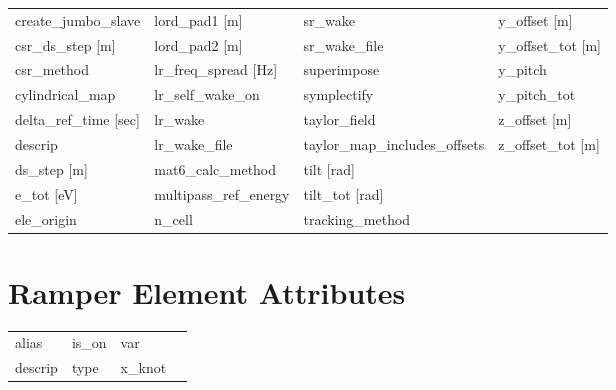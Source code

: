 \begin{tabular}{llll}
create_jumbo_slave               & lord_pad1 [m]                    & sr_wake                          & y_offset [m]                     \\
csr_ds_step [m]                  & lord_pad2 [m]                    & sr_wake_file                     & y_offset_tot [m]                 \\
csr_method                       & lr_freq_spread [Hz]              & superimpose                      & y_pitch                          \\
cylindrical_map                  & lr_self_wake_on                  & symplectify                      & y_pitch_tot                      \\
delta_ref_time [sec]             & lr_wake                          & taylor_field                     & z_offset [m]                     \\
descrip                          & lr_wake_file                     & taylor_map_includes_offsets      & z_offset_tot [m]                 \\
ds_step [m]                      & mat6_calc_method                 & tilt [rad]                       &                                  \\
e_tot [eV]                       & multipass_ref_energy             & tilt_tot [rad]                   &                                  \\
ele_origin                       & n_cell                           & tracking_method                  &                                  \\
 \bottomrule
 \end{tabular}
 \vfill
 
 \section{Ramper Element Attributes}
 \label{s:list.ramper}
 
 \begin{tabular}{llll} \toprule
alias                            & is_on                            & var                              &                                  \\
descrip                          & type                             & x_knot                           &                                  \\
 \bottomrule
 \end{tabular}
 \vfill
 
